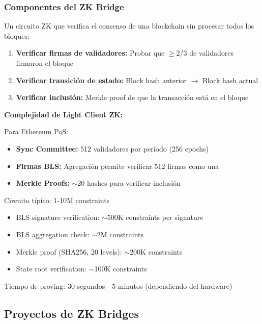 \documentclass[11pt,a4paper,twoside]{book}
\begin{document}
\subsubsection{Componentes del ZK Bridge}

\begin{definition}
Un circuito ZK que verifica el consenso de una blockchain sin procesar todos los bloques:
\begin{enumerate}
    \item \textbf{Verificar firmas de validadores:} Probar que $\geq 2/3$ de validadores firmaron el bloque
    \item \textbf{Verificar transici\'on de estado:} Block hash anterior $\to$ Block hash actual
    \item \textbf{Verificar inclusi\'on:} Merkle proof de que la transacci\'on est\'a en el bloque
\end{enumerate}
\end{definition}

\begin{mathnote}
\textbf{Complejidad de Light Client ZK:}

Para Ethereum PoS:
\begin{itemize}
    \item \textbf{Sync Committee:} 512 validadores por per\'iodo (256 epochs)
    \item \textbf{Firmas BLS:} Agregaci\'on permite verificar 512 firmas como una
    \item \textbf{Merkle Proofs:} $\sim$20 hashes para verificar inclusi\'on
\end{itemize}

Circuito t\'ipico: 1-10M constraints
\begin{itemize}
    \item BLS signature verification: $\sim$500K constraints per signature
    \item BLS aggregation check: $\sim$2M constraints
    \item Merkle proof (SHA256, 20 levels): $\sim$200K constraints
    \item State root verification: $\sim$100K constraints
\end{itemize}

Tiempo de proving: 30 segundos - 5 minutos (dependiendo del hardware)
\end{mathnote}

\subsection{Proyectos de ZK Bridges}
\end{document}
